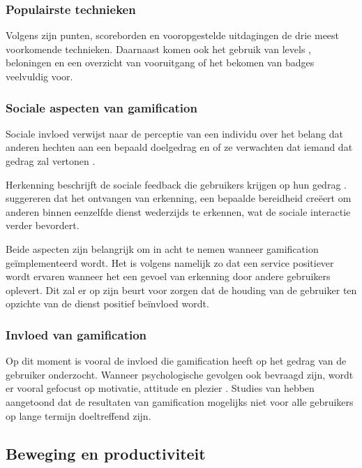 \subsubsection{Populairste technieken}
Volgens \textcite{Hamari2014} zijn punten, scoreborden en vooropgestelde uitdagingen de drie meest voorkomende technieken. Daarnaast komen ook het gebruik van levels \autocite{Dong2012}, beloningen \autocite{Flatla2011} en een overzicht van vooruitgang of het bekomen van badges \autocite{Li2012} veelvuldig voor.

\subsubsection{Sociale aspecten van gamification}
Sociale invloed verwijst naar de perceptie van een individu over het belang dat anderen hechten aan een bepaald doelgedrag en of ze verwachten dat iemand dat gedrag zal vertonen \autocite{Ajzen1991}.

Herkenning beschrijft de sociale feedback die gebruikers krijgen op hun gedrag \autocite{Cheung2011}. \textcite{Hamari2013} suggereren dat het ontvangen van erkenning, een bepaalde bereidheid creëert om anderen binnen eenzelfde dienst wederzijds te erkennen, wat de sociale interactie verder bevordert.

Beide aspecten zijn belangrijk om in acht te nemen wanneer gamification geïmplementeerd wordt. Het is volgens \textcite{Preece2001} namelijk zo dat een service positiever wordt ervaren wanneer het een gevoel van erkenning door andere gebruikers oplevert. Dit zal er op zijn beurt voor zorgen dat de houding van de gebruiker ten opzichte van de dienst positief beïnvloed wordt.

\subsubsection{Invloed van gamification}
Op dit moment is vooral de invloed die gamification heeft op het gedrag van de gebruiker onderzocht. Wanneer psychologische gevolgen ook bevraagd zijn, wordt er vooral gefocust op motivatie, attitude en plezier \autocite{Hamari2014}. Studies van \textcite{Hamari2013a} hebben aangetoond dat de resultaten van gamification mogelijks niet voor alle gebruikers op lange termijn doeltreffend zijn.

\subsection{Beweging en productiviteit}



